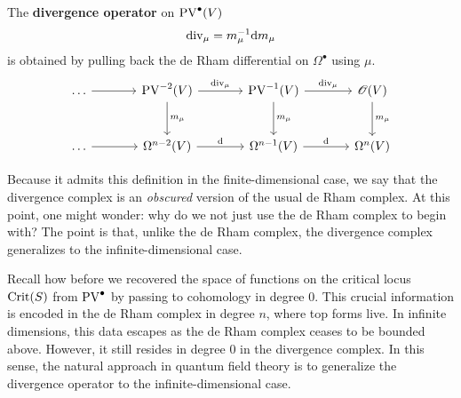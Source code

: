 The \textbf{divergence operator} on $\operatorname{PV}^{\bullet}(V)$
\begin{equation*}
  \operatorname{div}_\mu = m_\mu^{-1} \mathrm{d} m_\mu
\end{equation*}
is obtained by pulling back the de Rham differential on $\Omega^{\bullet}$ using $\mu$.
\begin{equation*}
  \begin{tikzcd}[sep=large]
    \dots 
    \arrow[r] &
    \PV^{-2}(V)
    \arrow[r, "\divergence_\mu"] \arrow[d, "m_\mu"] &
    \PV^{-1}(V)
    \arrow[r, "\divergence_\mu"] \arrow[d, "m_\mu"] &
    \Oscr(V)
    \arrow[d, "m_\mu"] \\
    \dots \arrow[r] &
    \Omega^{n-2}(V)
    \arrow[r, "\drm"] &
    \Omega^{n-1}(V)
    \arrow[r, "\drm"] &
    \Omega^{n}(V)
  \end{tikzcd}
\end{equation*}

Because it admits this definition in the finite-dimensional case, we say that the divergence complex is an \textit{obscured} version of the usual de Rham complex.
At this point, one might wonder: why do we not just use the de Rham complex to begin with?
The point is that, unlike the de Rham complex, the divergence complex generalizes to the infinite-dimensional case.

Recall how before we recovered the space of functions on the critical locus $\operatorname{Crit}(S)$ from $\operatorname{PV}^{\bullet}$ by passing to cohomology in degree $0$.
This crucial information is encoded in the de Rham complex in degree $n$, where top forms live.
In infinite dimensions, this data escapes as the de Rham complex ceases to be bounded above.
However, it still resides in degree $0$ in the divergence complex.
In this sense, the natural approach in quantum field theory is to generalize the divergence operator to the infinite-dimensional case.

